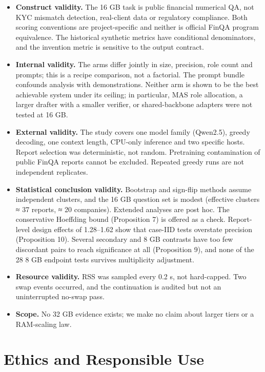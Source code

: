 \documentclass[letterpaper]{article}
\providecommand{\tightlist}{}
\begin{document}
\begin{itemize}
\tightlist
\item
  \textbf{Construct validity.} The 16 GB task is public financial numerical QA, not KYC mismatch detection, real-client data or regulatory compliance. Both scoring conventions are project-specific and neither is official FinQA program equivalence. The historical synthetic metrics have conditional denominators, and the invention metric is sensitive to the output contract.
\item
  \textbf{Internal validity.} The arms differ jointly in size, precision, role count and prompts; this is a recipe comparison, not a factorial. The prompt bundle confounds analysis with demonstrations. Neither arm is shown to be the best achievable system under its ceiling; in particular, MAS role allocation, a larger drafter with a smaller verifier, or shared-backbone adapters were not tested at 16 GB.
\item
  \textbf{External validity.} The study covers one model family (Qwen2.5), greedy decoding, one context length, CPU-only inference and two specific hosts. Report selection was deterministic, not random. Pretraining contamination of public FinQA reports cannot be excluded. Repeated greedy runs are not independent replicates.
\item
  \textbf{Statistical conclusion validity.} Bootstrap and sign-flip methods assume independent clusters, and the 16 GB question set is modest (effective clusters ≈ 37 reports, ≈ 20 companies). Extended analyses are post hoc. The conservative Hoeffding bound (Proposition 7) is offered as a check. Report-level design effects of 1.28--1.62 show that case-IID tests overstate precision (Proposition 10). Several secondary and 8 GB contrasts have too few discordant pairs to reach significance at all (Proposition 9), and none of the 28 8 GB endpoint tests survives multiplicity adjustment.
\item
  \textbf{Resource validity.} RSS was sampled every 0.2 s, not hard-capped. Two swap events occurred, and the continuation is audited but not an uninterrupted no-swap pass.
\item
  \textbf{Scope.} No 32 GB evidence exists; we make no claim about larger tiers or a RAM-scaling law.
\end{itemize}

\section{Ethics and Responsible Use}\label{ethics-and-responsible-use}
\end{document}
